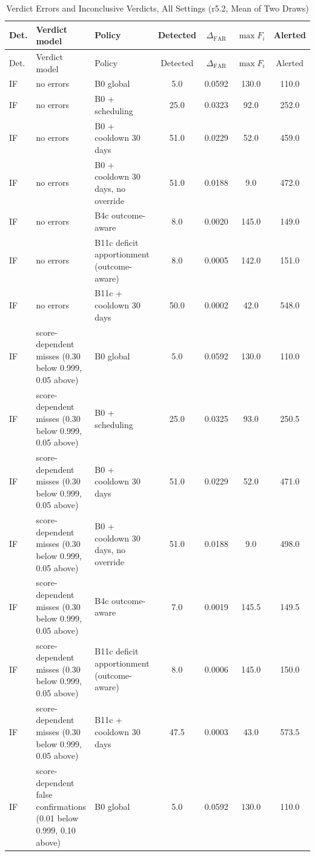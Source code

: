 \documentclass[10pt,onecolumn,letterpaper]{article}
\begin{document}
\begin{longtable}{lp{5.2cm}p{4.4cm}cccc}
\caption{Verdict Errors and Inconclusive Verdicts, All Settings (r5.2, Mean of Two Draws)\label{tab:e-l4-r52}}\\
\toprule
Det. & Verdict model & Policy & Detected & $\Delta_{\mathrm{FAR}}$ & $\max F_i$ & Alerted \\
\midrule
\endfirsthead
\toprule
Det. & Verdict model & Policy & Detected & $\Delta_{\mathrm{FAR}}$ & $\max F_i$ & Alerted \\
\midrule
\endhead
IF & no errors & B0 global & 5.0 & 0.0592 & 130.0 & 110.0 \\
IF & no errors & B0 + scheduling & 25.0 & 0.0323 & 92.0 & 252.0 \\
IF & no errors & B0 + cooldown 30 days & 51.0 & 0.0229 & 52.0 & 459.0 \\
IF & no errors & B0 + cooldown 30 days, no override & 51.0 & 0.0188 & 9.0 & 472.0 \\
IF & no errors & B4c outcome-aware & 8.0 & 0.0020 & 145.0 & 149.0 \\
IF & no errors & B11c deficit apportionment (outcome-aware) & 8.0 & 0.0005 & 142.0 & 151.0 \\
IF & no errors & B11c + cooldown 30 days & 50.0 & 0.0002 & 42.0 & 548.0 \\
IF & score-dependent misses (0.30 below 0.999, 0.05 above) & B0 global & 5.0 & 0.0592 & 130.0 & 110.0 \\
IF & score-dependent misses (0.30 below 0.999, 0.05 above) & B0 + scheduling & 25.0 & 0.0325 & 93.0 & 250.5 \\
IF & score-dependent misses (0.30 below 0.999, 0.05 above) & B0 + cooldown 30 days & 51.0 & 0.0229 & 52.0 & 471.0 \\
IF & score-dependent misses (0.30 below 0.999, 0.05 above) & B0 + cooldown 30 days, no override & 51.0 & 0.0188 & 9.0 & 498.0 \\
IF & score-dependent misses (0.30 below 0.999, 0.05 above) & B4c outcome-aware & 7.0 & 0.0019 & 145.5 & 149.5 \\
IF & score-dependent misses (0.30 below 0.999, 0.05 above) & B11c deficit apportionment (outcome-aware) & 8.0 & 0.0006 & 145.0 & 150.0 \\
IF & score-dependent misses (0.30 below 0.999, 0.05 above) & B11c + cooldown 30 days & 47.5 & 0.0003 & 43.0 & 573.5 \\
IF & score-dependent false confirmations (0.01 below 0.999, 0.10 above) & B0 global & 5.0 & 0.0592 & 130.0 & 110.0 \\

\end{longtable}
\end{document}
